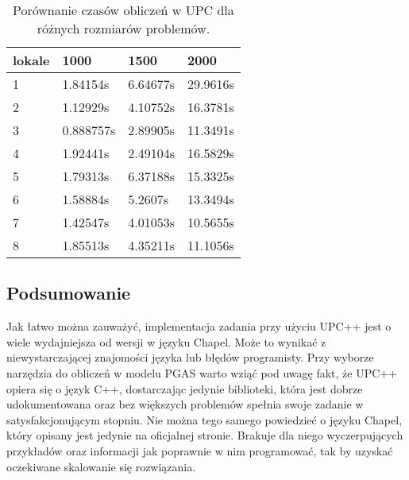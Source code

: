     \begin{table}[]
    \centering
    \begin{tabular}{l|l|l|l}
    \textbf{lokale} & \textbf{1000} & \textbf{1500} & \textbf{2000} \\ \hline
    1               & 1.84154s      & 6.64677s      & 29.9616s      \\
    2               & 1.12929s      & 4.10752s      & 16.3781s      \\
    3               & 0.888757s     & 2.89905s      & 11.3491s      \\
    4               & 1.92441s      & 2.49104s      & 16.5829s      \\
    5               & 1.79313s      & 6.37188s      & 15.3325s      \\
    6               & 1.58884s      & 5.2607s       & 13.3494s      \\
    7               & 1.42547s      & 4.01053s      & 10.5655s      \\
    8               & 1.85513s      & 4.35211s      & 11.1056s     
    \end{tabular}
    \caption{Porównanie czasów obliczeń w UPC dla różnych rozmiarów problemów.}
    \label{tab:matrixmulupc}
    \end{table}
    
    \subsection{Podsumowanie}
    Jak łatwo można zauważyć, implementacja zadania przy użyciu UPC++ jest o wiele wydajniejsza od wersji w języku Chapel.
    Może to wynikać z niewystarczającej znajomości języka lub błędów programisty.
    Przy wyborze narzędzia do obliczeń w modelu PGAS warto wziąć pod uwagę fakt, że UPC++ opiera się o język C++, dostarczając jedynie biblioteki, która jest dobrze udokumentowana oraz bez większych problemów spełnia swoje zadanie w satysfakcjonującym stopniu.
    Nie można tego samego powiedzieć o języku Chapel, który opisany jest jedynie na oficjalnej stronie.
    Brakuje dla niego wyczerpujących przykładów oraz informacji jak poprawnie w nim programować, tak by uzyskać oczekiwane skalowanie się rozwiązania.